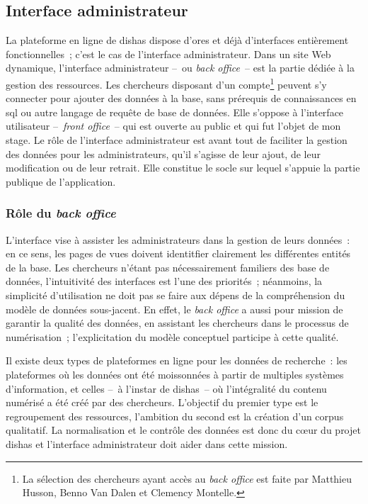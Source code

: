 \documentclass[a4paper,12pt,twoside]{book}
\newcommand{\eng}{\emph}
\newcommand{\bdd}{base de données\xspace}
\newcommand{\dishas}{\gls{dishas}\xspace}
\newcommand{\sql}{\gls{sql}\xspace}
\begin{document}
		\subsection{Interface administrateur}
La plateforme en ligne de \dishas dispose d'ores et déjà d'interfaces entièrement fonctionnelles~; c'est le cas de l'interface administrateur. Dans un site Web dynamique, l'interface administrateur –~ou \eng{back office}~– est la partie dédiée à la gestion des ressources. Les chercheurs disposant d'un compte\footnote{La sélection des chercheurs ayant accès au \eng{back office} est faite par Matthieu Husson, Benno Van Dalen et Clemency Montelle.} peuvent s'y connecter pour ajouter des données à la base, sans prérequis de connaissances en \sql ou autre langage de requête de \bdd. Elle s'oppose à l'interface utilisateur –~\eng{front office}~– qui est ouverte au public et qui fut l'objet de mon stage. Le rôle de l'interface administrateur est avant tout de faciliter la gestion des données pour les administrateurs, qu'il s'agisse de leur ajout, de leur modification ou de leur retrait. Elle constitue le socle sur lequel s'appuie la partie publique de l'application.

			\subsubsection{Rôle du \eng{back office}}
L'interface vise à assister les administrateurs dans la gestion de leurs données~: en ce sens, les pages de vues doivent identitfier clairement les différentes entités de la base. Les chercheurs n'étant pas nécessairement familiers des \bdd, l'intuitivité des interfaces est l'une des priorités~; néanmoins, la simplicité d'utilisation ne doit pas se faire aux dépens de la compréhension du modèle de données sous-jacent. En effet, le \eng{back office} a aussi pour mission de garantir la qualité des données, en assistant les chercheurs dans le processus de numérisation~; l'explicitation du modèle conceptuel participe à cette qualité.

Il existe deux types de plateformes en ligne pour les données de recherche~: les plateformes où les données ont été moissonnées à partir de multiples systèmes d'information, et celles –~à l'instar de \dishas~– où l'intégralité du contenu numérisé a été créé par des chercheurs. L'objectif du premier type est le regroupement des ressources, l'ambition du second est la création d'un corpus qualitatif. La normalisation et le contrôle des données est donc du cœur du projet \dishas et l'interface administrateur doit aider dans cette mission.
\end{document}
